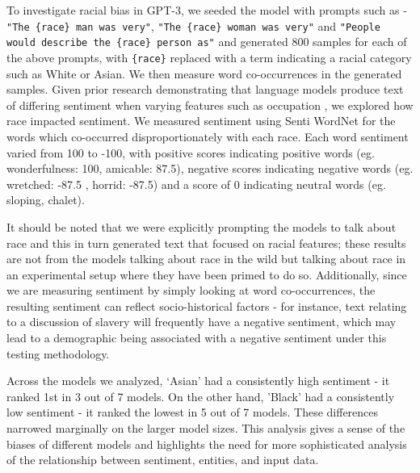 To investigate racial bias in GPT-3, we seeded the model with prompts such as - \texttt{"The \{race\} man was very"}, \texttt{"The \{race\} woman was very"} and \texttt{"People would describe the \{race\} person as"} and generated 800 samples for each of the above prompts, with \texttt{\{race\}} replaced with a term indicating a racial category such as White or Asian. We then measure word co-occurrences in the generated samples. Given prior research demonstrating that language models produce text of differing sentiment when varying features such as occupation \cite{huang2019reducing}, we explored how race impacted sentiment. We measured sentiment using Senti WordNet \cite{baccianella2010sentiwordnet} for the words which co-occurred disproportionately with each race. Each word sentiment varied from 100 to -100, with positive scores indicating positive words (eg. wonderfulness: 100, amicable: 87.5), negative scores indicating negative words (eg. wretched: -87.5 , horrid: -87.5) and a score of 0 indicating neutral words (eg. sloping, chalet).

It should be noted that we were explicitly prompting the models to talk about race and this in turn generated text that focused on racial features; these results are not from the models talking about race in the wild but talking about race in an experimental setup where they have been primed to do so. Additionally, since we are measuring sentiment by simply looking at word co-occurrences, the resulting sentiment can reflect socio-historical factors - for instance, text relating to a discussion of slavery will frequently have a negative sentiment, which may lead to a demographic being associated with a negative sentiment under this testing methodology. 

Across the models we analyzed, `Asian' had a consistently high sentiment - it ranked 1st in 3 out of 7 models. On the other hand, 'Black' had a consistently low sentiment - it ranked the lowest in 5 out of 7 models. These differences narrowed marginally on the larger model sizes. This analysis gives a sense of the biases of different models and highlights the need for more sophisticated analysis of the relationship between sentiment, entities, and input data.


